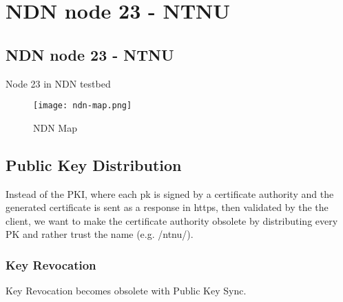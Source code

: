 \chapter{NDN node 23 - NTNU}\label{chp4:} 

\section{NDN node 23 - NTNU}
Node 23 in NDN testbed

\begin{figure}[ht]
  \centering
  \texttt{[image: ndn-map.png]}
  \caption{NDN Map}
  \label{fig:ndn-map}
\end{figure}

\section{Public Key Distribution}
Instead of the PKI, where each pk is signed by a certificate authority and the generated certificate is sent as a response in https, then validated by the the client, we want to make the certificate authority obsolete by distributing every PK and rather trust the name (e.g. /ntnu/). 

\subsection{Key Revocation}
Key Revocation becomes obsolete with Public Key Sync. 